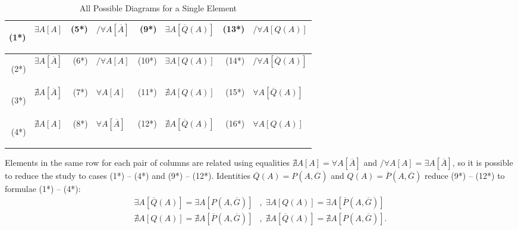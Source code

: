 \documentclass{fundam}
\begin{document}
\begin{table*}[hbtp]
  \centering
  \begin{tabular}{|rl|rl||rl|rl|}
    \hline
    \begin{Large}\phantom{I}\end{Large}(1*) & $\exists A [ A ]$ & (5*)
    & $\slash\!\!\forall A [\overline{A}]$ & (9*) & $\exists A
    [\overline{Q}(A)]$ & (13*) & $\slash\!\!\forall A [Q(A)]$\\
    \hline
    \begin{Large}\phantom{I}\end{Large}(2*) & $\exists A
    [\overline{A}]$ & (6*) & $\slash\!\!\forall A [A]$ & (10*) &
    $\exists A [Q(A)]$ & (14*) & $\slash\!\!\forall A
    [\overline{Q}(A)]$\\ 
    \hline
    \begin{Large}\phantom{I}\end{Large}(3*) & $\nexists A
    [\overline{A}]$ & (7*) & $\forall A [A]$ & (11*) & $\nexists A
    [Q(A)]$ & (15*) & $\forall A [\overline{Q}(A)]$\\
    \hline
    \begin{Large}\phantom{I}\end{Large}(4*) & $\nexists A [ A ]$ &
    (8*) & $\forall A [\overline{A}]$ & (12*) & $\nexists A
    [\overline{Q}(A)]$ & (16*) & $\forall A [Q(A)]$\\
    \hline
  \end{tabular}
  \caption{All Possible Diagrams for a Single Element}
  \label{tab:possibilitiesSingleCase}
\end{table*}

Elements in the same row for each pair of columns are related using
equalities $\nexists A[A] = \forall A[\overline{A}]$ and
$\slash\!\!\forall A[A] = \exists A[\overline{A}]$, so it is possible
to reduce the study to cases (1*) -- (4*) and (9*) --
(12*). Identities $\overline{Q}(A) = P(A, \overline{G})$ and $Q(A) =
\overline{P}(A, \overline{G})$ reduce (9*) -- (12*) to formulae (1*)
-- (4*):
\begin{align}
  \exists A [\overline{Q}(A)] = \exists A\left[P(A,
    \overline{G})\right] &, \; \exists A [Q(A)] = \exists
  A\left[\overline{P}(A, \overline{G})\right] \nonumber \\
  \nexists A [Q(A)] = \nexists A\left[\overline{P}(A,
    \overline{G})\right] &, \; \nexists A [\overline{Q}(A)] = \nexists
  A\left[P(A, \overline{G})\right]. \nonumber
\end{align}
\end{document}
